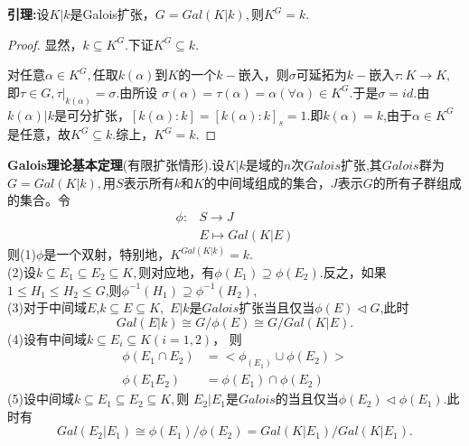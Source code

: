 \documentclass[UTF8]{article}
\begin{document}
\textbf{引理:}设$K|k$是Galois扩张，$G=Gal(K|k),$则$K^{G}=k.$
\begin{proof}
	显然，$k\subseteq K^{G}.$下证$K^{G}\subseteq k.$
	
	对任意$\alpha\in K^{G},$任取$k(\alpha)$到$K$的一个$k-$嵌入，则$\sigma$可延拓为$k-$嵌入$\tau:K\rightarrow K,$
	即$\tau\in G,
	\tau|_{k(\alpha)}=\sigma.$由所设
	$\sigma (\alpha)=\tau(\alpha)=\alpha(\forall \alpha)\in K^{G}$.于是$\sigma=id.$由$k(\alpha)|k$是可分扩张，$[k(\alpha):k]=[k(\alpha):k]_{s}=1.$即$k(\alpha)=k$,由于$\alpha\in K^{G}$是任意，故$K^{G}\subseteq k.$综上，$K^{G}=k.$
\end{proof}


\textbf{Galois理论基本定理}(有限扩张情形).设$K|k$是域的$n$次$Galois$扩张,其$Galois$群为\\
$G=Gal(K|k),$用$S$表示所有$k$和$K$的中间域组成的集合，$J$表示$G$的所有子群组成的集合。令
\[\begin{split}
\phi:&S\rightarrow J\\
&E\mapsto Gal(K|E)
\end{split}
\]
则(1)$\phi$是一个双射，特别地，$K^{Gal(K|k)}=k$.\\
(2)设$k\subseteq E_{1}\subseteq E_{2}\subseteq K,$则对应地，有$\phi(E_{1})\supseteq \phi(E_{2}).$反之，如果
$1\leq H_{1}\leq H_{2}\leq G$,则$\phi^{-1}(H_{1})\supseteq \phi^{-1}(H_{2}),$\\
(3)对于中间域$E$,$k\subseteq E\subseteq K,$ $E|k$是$Galois$扩张当且仅当$\phi(E)\triangleleft G$,此时
$$
Gal(E|k)\cong G/\phi(E)\cong G/Gal(K|E).
$$
(4)设有中间域$k\subseteq E_{i}\subseteq K(i=1,2)$，
则 
\[
\begin{split}
\phi(E_{1}\cap E_{2})&=<\phi_(E_{1})\cup \phi(E_{2})>\\
\phi(E_{1}E_{2})&=\phi(E_{1})\cap \phi(E_{2})
\end{split}
\]
(5)设中间域$k\subseteq E_{1}\subseteq E_{2}\subseteq K,$则
$E_{2}|E_{1}$是$Galois$的当且仅当$\phi(E_{2})\triangleleft \phi(E_{1}).$此时有
$$
Gal(E_{2}|E_{1})\cong \phi(E_{1})/\phi(E_{2})=Gal(K|E_{1})/Gal(K|E_{1}).
$$
\end{document}
